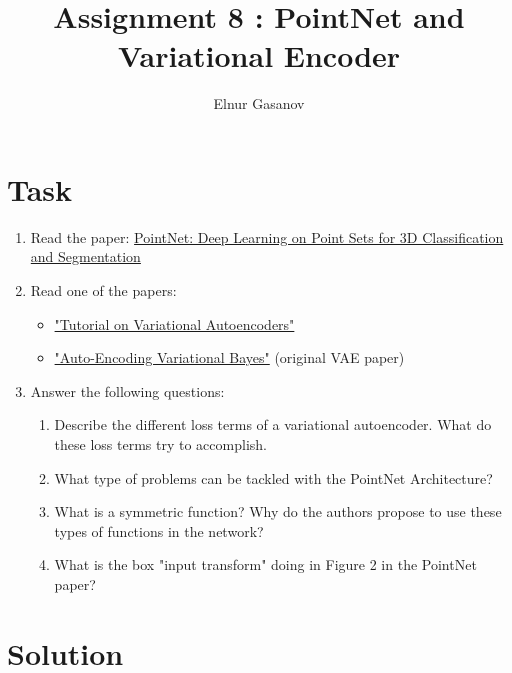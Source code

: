 \documentclass{article}
\author{Elnur Gasanov}
\date{}
\title{Assignment 8 : PointNet and Variational Encoder}
\begin{document}
\maketitle

\section{Task}
\begin{enumerate}
	\item Read the paper: \href{https://arxiv.org/abs/1612.00593}{PointNet: Deep Learning on Point Sets for 3D Classification and Segmentation}
	\item Read one of the papers: 
		\begin{itemize} \item \href{https://arxiv.org/abs/1606.05908}{"Tutorial on Variational Autoencoders"} \item \href{https://arxiv.org/abs/1312.6114}{"Auto-Encoding Variational Bayes"} (original VAE paper) \end{itemize}
	\item Answer the following questions:
		\begin{enumerate}
			\item Describe the different loss terms of a variational autoencoder. What do these loss terms try to accomplish.
			\item What type of problems can be tackled with the PointNet Architecture?
			\item What is a symmetric function? Why do the authors propose to use these types of functions in the network?
			\item What is the box "input transform" doing in Figure 2 in the PointNet paper?
		\end{enumerate}
\end{enumerate}

\section{Solution}
\end{document}
